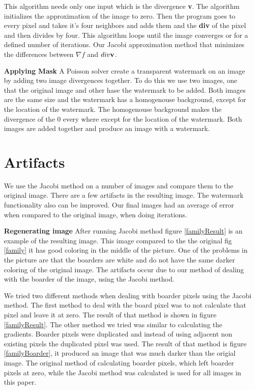 \documentclass[10pt,twopage]{acmsiggraph}
\begin{document}
This algorithm needs only one input which is the divergence {\bf v}. The algorithm initializes the approximation of the image to zero. Then the program goes to every pixel and takes it's four neighbors and adds them and the {\bf div} of the pixel and then divides by four. This algorithm loops until the image converges or for a defined number of iterations. Our Jacobi approximation method that minimizes the differences between $\nabla f$ and $div{\bf v}$.

{\bf Applying Mask} A Poisson solver create a transparent watermark on an image by adding two image divergences together. To do this we use two images, one that the original image and other hase the watermark to be added. Both images are the same size and the watermark has a homogenouse background, except for the location of the watermark. The homogenouse background makes the divergence of the 0 every where except for the location of the watermark. Both images are added together and produce an image with a watermark.

\section{Artifacts}

We use the Jacobi method on a number of images and compare them to the original image. There are a few artifacts in the resulting image. The watermark functionality also can be improved. Our final images had an average of \result error when compared to the original image, when doing \iteration iterations.

{\bf Regenerating image} After running Jacobi method figure \ref{familyResult} is an example of the resulting image. This image compared to the the original fig \ref{family} it has good coloring in the middle of the picture. One of the problems in the picture are that the boarders are white and do not have the same darker coloring of the original image. The artifacts occur due to our method of dealing with the boarder of the image, using the Jacobi method.

We tried two different methods when dealing with boarder pixels using the Jacobi method. The first method to deal with the board pixel was to not calculate that pixel and leave it at zero. The result of that method is shown in figure \ref{familyResult}. The other method we tried was similar to calculating the gradients. Boarder pixels were duplicated and instead of using adjacent non existing pixels the duplicated pixel was used. The result of that method is figure \ref{familyBoarder}, it produced an image that was much darker than the origial image. The original method of calculating boarder pixels, which left boarder pixels at zero, while the Jacobi method was calculated is used for all images in this paper.
\end{document}
